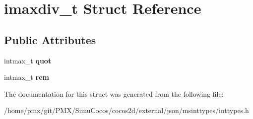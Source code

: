 \hypertarget{structimaxdiv__t}{}\section{imaxdiv\+\_\+t Struct Reference}
\label{structimaxdiv__t}
\subsection*{Public Attributes}
\begin{DoxyCompactItemize}
\item 
\mbox{\label{structimaxdiv__t_a9339814cbb7610c72fb7d30c6573b393}} 
intmax\+\_\+t {\bfseries quot}
\item 
\mbox{\label{structimaxdiv__t_a6c9701ad10bff81edae7ff679cae7850}} 
intmax\+\_\+t {\bfseries rem}
\end{DoxyCompactItemize}


The documentation for this struct was generated from the following file\+:\begin{DoxyCompactItemize}
\item 
/home/pmx/git/\+P\+M\+X/\+Simu\+Cocos/cocos2d/external/json/msinttypes/inttypes.\+h\end{DoxyCompactItemize}
